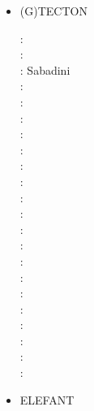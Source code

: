 \begin{itemize}
\item {\codefont (G)TECTON}  

\begin{scriptsize}
\nineteeneighty: \cite{mera80}\\
\nineteeneightyone: \cite{mera81}\\
\nineteeneightysix: Sabadini \etal \cite{sayp86}\\
\nineteenninetythree: \cite{gowo93}\\
\nineteenninetyfive: \cite{gowo95}\\
\nineteenninetysix: \cite{guez96}\cite{gisb96}\\
\nineteenninetynine: \cite{gowo99}\cite{fugo99}\\
\twothousandone: \cite{bugw01}\cite{gome01}\\
\twothousandtwo: \cite{bugw02}\\
\twothousandfive: \cite{gowo05}\cite{vanw05}\cite{vabl05}\cite{gowo05}\\
\twothousandsix: \cite{degw06}\cite{libi06}\cite{scdm06}\\
\twothousandseven: \cite{vabl07}\\
\twothousandeight: \cite{degw08}\cite{degw08b}\\
\twothousandnine: \cite{ladg09}\cite{plmg09}\\
\twothousandten: \cite{vago10}\cite{plmf10}\\
\twothousandeleven: \cite{bagw11}\cite{bagw11b}\\
\twothousandthirteen: \cite{plab13}\cite{wagw13}\\
\twothousandfourteen: \cite{vagw14}\\
\twothousandfifteen: \cite{mags15}\cite{nigo15}\\
\twothousandsixteen: \cite{gemg16}\cite{masg16}\\
\twothousandseventeen: \cite{ozgw17}\\
\twothousandeighteen: \cite{gofv18}\cite{nigw18}\cite{hefg18}
\end{scriptsize}

\item {\codefont ELEFANT} 


\end{itemize}
